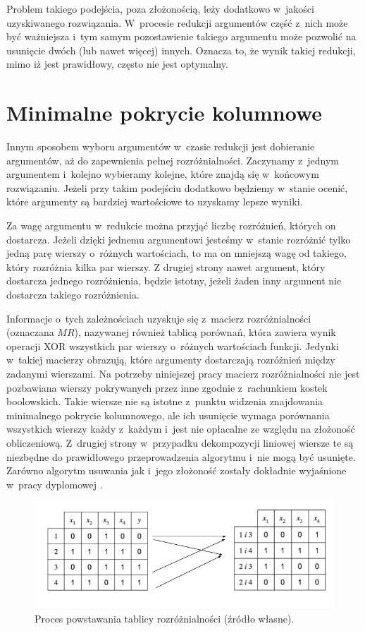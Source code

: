 Problem takiego podejścia,
poza złożonością,
leży dodatkowo w~jakości uzyskiwanego rozwiązania.
W~procesie redukcji argumentów część z~nich może być ważniejsza
i~tym samym pozostawienie takiego argumentu może pozwolić na usunięcie dwóch (lub nawet więcej) innych.
Oznacza to,
że wynik takiej redukcji,
mimo iż jest prawidłowy,
często nie jest optymalny.

\section{Minimalne pokrycie kolumnowe}

Innym sposobem wyboru argumentów w~czasie redukcji jest dobieranie argumentów,
aż do zapewnienia pełnej rozróżnialności.
Zaczynamy z~jednym argumentem i~kolejno wybieramy kolejne,
które znajdą się w~końcowym rozwiązaniu.
Jeżeli przy takim podejściu dodatkowo będziemy w~stanie ocenić,
które argumenty są bardziej wartościowe to uzyskamy lepsze wyniki.

Za wagę argumentu w~redukcie można przyjąć liczbę rozróżnień,
których on dostarcza.
Jeżeli dzięki jednemu argumentowi jesteśmy w~stanie rozróżnić tylko jedną parę wierszy o~różnych wartościach,
to ma on mniejszą wagę od takiego,
który rozróżnia kilka par wierszy.
Z drugiej strony nawet argument,
który dostarcza jednego rozróżnienia,
będzie istotny,
jeżeli żaden inny argument nie dostarcza takiego rozróżnienia.

Informacje o~tych zależnościach uzyskuje się z~macierz rozróżnialności (oznaczana $MR$), nazywanej również tablicą porównań,
która zawiera wynik operacji XOR wszystkich par wierszy o~różnych wartościach funkcji.
Jedynki w~takiej macierzy obrazują,
które argumenty dostarczają rozróżnień między zadanymi wierszami.
Na potrzeby niniejszej pracy macierz rozróżnialności nie jest pozbawiana wierszy pokrywanych przez inne zgodnie z~rachunkiem kostek boolowskich.
Takie wiersze nie są istotne z~punktu widzenia znajdowania minimalnego pokrycie kolumnowego,%
ale ich usunięcie wymaga porównania wszystkich wierszy każdy z~każdym
i~jest nie opłacalne ze względu na złożoność obliczeniową.
Z~drugiej strony w~przypadku dekompozycji liniowej wiersze te są niezbędne do prawidłowego przeprowadzenia algorytmu i~nie mogą być usunięte.
Zarówno algorytm usuwania jak i~jego złożoność zostały dokładnie wyjaśnione w~pracy dyplomowej \cite{inzynierka}.

\begin{figure}[H]
\centering
\includegraphics[width = 13cm]{chapter02/discernibility-table.png}
\caption{Proces powstawania tablicy rozróżnialności (źródło własne).}
\end{figure}

